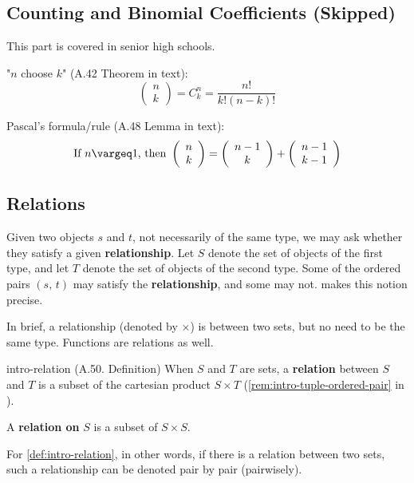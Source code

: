 \documentclass[../src/handouts/main.tex]{subfiles}
\begin{document}
\label{subsec:intro-function-end}

\subsection{Counting and Binomial Coefficients (Skipped)}

This part is covered in senior high schools.

"$n$ choose $k$" (A.42 Theorem in text):
\begin{equation}
  \left(\begin{array}{c} n \\ k \end{array}\right) = C^n_k = \frac{n!}{k! (n - k)!}
  \label{eq:intro-combination}
\end{equation}

Pascal's formula/rule (A.48 Lemma in text):
\begin{equation}
  \text{If } n \geq 1 \text{, then } \C{n}{k} = \C{n - 1}{k} + \C{n - 1}{k - 1}
  \label{eq:intro-pascal}
\end{equation}

\subsection{Relations}

Given two objects $s$ and $t$, not necessarily of the same type, we may ask whether they satisfy a given \textbf{relationship}.
Let $S$ denote the set of objects of the first type, and let $T$ denote the set of objects of the second type.
Some of the ordered pairs $(s,\, t)$ may satisfy the \textbf{relationship}, and some may not.
 makes this notion precise.

In brief, a relationship (denoted by $\times$) is between two sets, but no need to be the same type. Functions are relations as well.

\begin{definition}{}{intro-relation}
  (A.50. Definition)
  When $S$ and $T$ are sets, a \textbf{relation} between $S$ and $T$ is a subset of the cartesian product $S \times T$ (\cref{rem:intro-tuple-ordered-pair} in ).

  A \textbf{relation on} $S$ is a subset of $S \times S$.
\end{definition}

For \cref{def:intro-relation}, in other words, if there is a relation between two sets, such a relationship can be denoted pair by pair (pairwisely).
\end{document}

